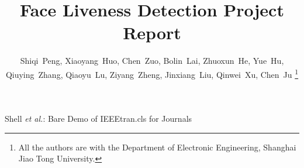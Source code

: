 \documentclass[journal]{IEEEtran}
\begin{document}
%
\title{Face Liveness Detection Project Report}
%
%
%

\author{Shiqi~Peng, Xiaoyang~Huo, Chen~Zuo, Bolin~Lai, Zhuoxun~He, Yue~Hu, Qiuying~Zhang, Qiaoyu~Lu, Ziyang~Zheng, Jinxiang~Liu, Qinwei~Xu, Chen~Ju%
\thanks{All the authors are with the Department
of Electronic Engineering, Shanghai Jiao Tong University.}}

% 
%



%
{Shell \MakeLowercase{\textit{et al.}}: Bare Demo of IEEEtran.cls for Journals}
% 
\end{document}
